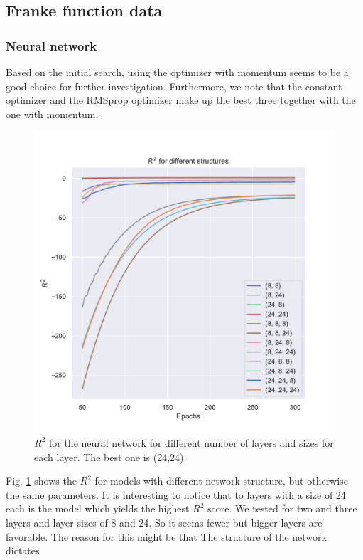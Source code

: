 \subsection{Franke function data}

\subsubsection{Neural network}

Based on the initial search, using the optimizer with momentum seems to be a good choice for further investigation.
Furthermore, we note that the constant optimizer and the RMSprop optimizer make up the best three together with the one with momentum.

\begin{figure}[h!]
    \centering
    \includegraphics[width=1.0\linewidth]{project_2/figures/$R^2$ for different structures_continuous.pdf}
    \caption{$R^2$ for the neural network for different number of layers and sizes for each layer. The best one is (24,24).}
    \label{fig:structure_franke}
\end{figure}

Fig. \ref{fig:structure_franke} shows the $R^2$ for models with different network structure, but otherwise the same parameters. It is interesting to notice that to layers with a size of 24 each is the model which yields the highest $R^2$ score. We tested for two and three layers and layer sizes of 8 and 24. So it seems fewer but bigger layers are favorable. 
The reason for this might be that \mia{}
The structure of the network dictates 

